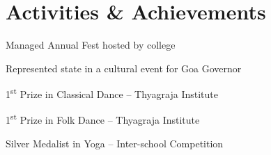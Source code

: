\documentclass[a4paper,10pt]{article}
\newcommand{\resumeItem}[1]{\item\small{#1}}
\begin{document}
\section*{Activities \& Achievements}
\resumeItem{Managed Annual Fest hosted by college}
\resumeItem{Represented state in a cultural event for Goa Governor}
\resumeItem{1\textsuperscript{st} Prize in Classical Dance – Thyagraja Institute}
\resumeItem{1\textsuperscript{st} Prize in Folk Dance – Thyagraja Institute}
\resumeItem{Silver Medalist in Yoga – Inter-school Competition}
\end{document}
